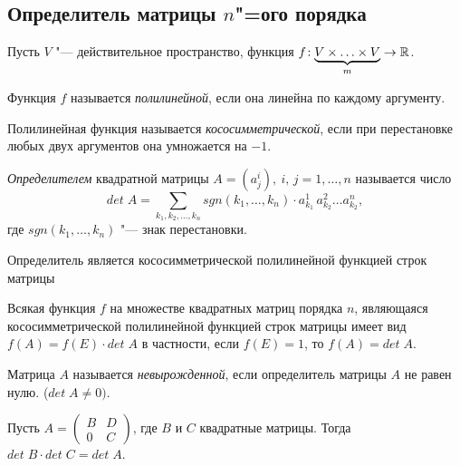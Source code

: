 \subsection*{Определитель матрицы $n$"=ого порядка}

Пусть $V$ "--- действительное пространство, функция $f\!: \underbrace{V \times \ldots \times V}_{m} \to \mathbb{R}$.
\begin{definition}
  Функция $f$ называется \textit{полилинейной}, если она линейна по каждому аргументу.
\end{definition}
\begin{definition}
  Полилинейная функция называется \textit{кососимметрической}, если при перестановке любых двух аргументов она умножается на $-1$.
\end{definition}

\begin{definition}
  \textit{Определителем} квадратной матрицы $A = (a_j^i),~ i,\,j = 1,\ldots,n$ называется число $$det\;A = \sum\limits_{k_1, k_2, \ldots, k_n}sgn(k_1, \ldots, k_n) \cdot a_{k_1}^1 \, a_{k_2}^2 \ldots a_{k_2}^n, $$
  где $sgn(k_1, \ldots, k_n)$ "--- знак перестановки.
\end{definition}

\begin{theorem}
  Определитель является кососимметрической полилинейной функцией строк матрицы 
  
  Всякая функция $f$ на множестве квадратных матриц порядка $n$, являющаяся кососимметрической полилинейной функцией строк матрицы имеет вид
  $f(A) = f(E) \cdot det\;A$ в частности, если $f(E) = 1$, то $f(A) = det\;A$.
\end{theorem}

\begin{definition}
  Матрица $A$ называется \textit{невырожденной}, если определитель матрицы $A$ не равен нулю. ($det\; A \neq 0)$.
\end{definition}
\begin{theorem}
  Пусть $A = \begin{pmatrix}
    B & D \\
    0 & C
  \end{pmatrix}$, где $B$ и $C$ квадратные матрицы. Тогда $det\;B \cdot det\;C = det\;A$.
\end{theorem}

